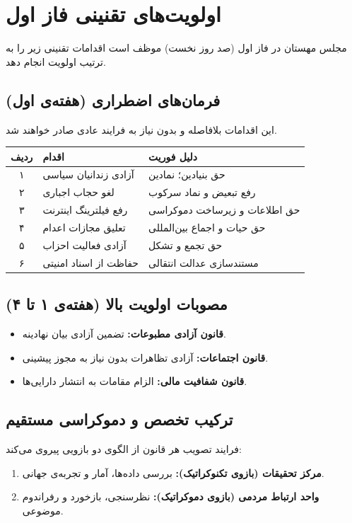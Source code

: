 \chapter{اولویت‌های تقنینی فاز اول}

مجلس مهستان در فاز اول (صد روز نخست) موظف است اقدامات تقنینی زیر را به ترتیب اولویت انجام دهد.

\section{فرمان‌های اضطراری (هفته‌ی اول)}
این اقدامات بلافاصله و بدون نیاز به فرایند عادی صادر خواهند شد.

\begin{tabular}{clp{8cm}}
\toprule
\textbf{ردیف} & \textbf{اقدام} & \textbf{دلیل فوریت} \\
\midrule
۱ & آزادی زندانیان سیاسی & حق بنیادین؛ نمادین \\
۲ & لغو حجاب اجباری & رفع تبعیض و نماد سرکوب \\
۳ & رفع فیلترینگ اینترنت & حق اطلاعات و زیرساخت دموکراسی \\
۴ & تعلیق مجازات اعدام & حق حیات و اجماع بین‌المللی \\
۵ & آزادی فعالیت احزاب & حق تجمع و تشکل \\
۶ & حفاظت از اسناد امنیتی & مستندسازی عدالت انتقالی \\
\bottomrule
\end{tabular}

\section{مصوبات اولویت بالا (هفته‌ی ۱ تا ۴)}
\begin{itemize}
    \item \textbf{قانون آزادی مطبوعات:} تضمین آزادی بیان نهادینه.
    \item \textbf{قانون اجتماعات:} آزادی تظاهرات بدون نیاز به مجوز پیشینی.
    \item \textbf{قانون شفافیت مالی:} الزام مقامات به انتشار دارایی‌ها.
\end{itemize}

\section{ترکیب تخصص و دموکراسی مستقیم}
فرایند تصویب هر قانون از الگوی دو بازویی پیروی می‌کند:
\begin{enumerate}
    \item \textbf{مرکز تحقیقات (بازوی تکنوکراتیک):} بررسی داده‌ها، آمار و تجربه‌ی جهانی.
    \item \textbf{واحد ارتباط مردمی (بازوی دموکراتیک):} نظرسنجی، بازخورد و رفراندوم موضوعی.
\end{enumerate}

